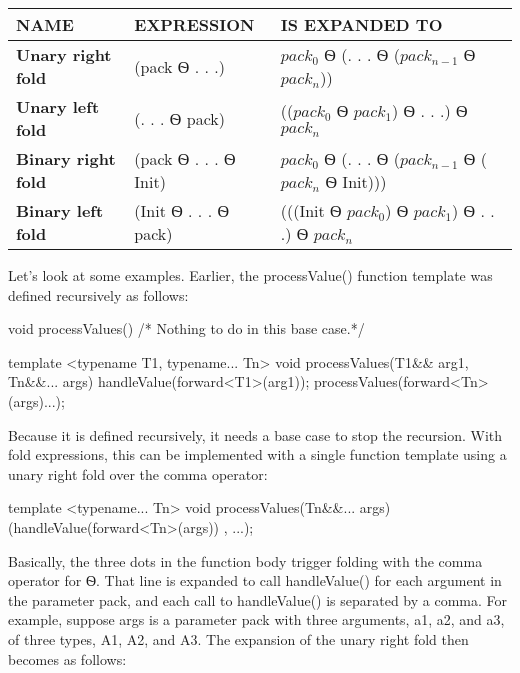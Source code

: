 \begin{longtable}{|l|l|l|}
\hline
\textbf{NAME}             & \textbf{EXPRESSION} & \textbf{IS EXPANDED TO}             \\ \hline
\endfirsthead
%
\endhead
%
\textbf{Unary right fold} & (pack Ѳ . . .)      & $pack_0$ Ѳ (. . . Ѳ ($pack_{n-1}$ Ѳ $pack_n$)) \\ \hline
\textbf{Unary left fold}  & (. . . Ѳ pack)      & (($pack_0$ Ѳ $pack_1$) Ѳ . . .) Ѳ $pack_n$   \\ \hline
\textbf{Binary right fold} & (pack Ѳ . . . Ѳ Init) & $pack_0$ Ѳ (. . . Ѳ ($pack_{n-1}$ Ѳ ($pack_n$ Ѳ Init))) \\ \hline
\textbf{Binary left fold}  & (Init Ѳ . . . Ѳ pack) & (((Init Ѳ $pack_0$) Ѳ $pack_1$) Ѳ . . .) Ѳ $pack_n$   \\ \hline
\end{longtable}

Let’s look at some examples. Earlier, the processValue() function template was defined recursively as follows:

\begin{cpp}
void processValues() { /* Nothing to do in this base case.*/ }

template <typename T1, typename... Tn>
void processValues(T1&& arg1, Tn&&... args)
{
    handleValue(forward<T1>(arg1));
    processValues(forward<Tn>(args)...);
}
\end{cpp}

Because it is defined recursively, it needs a base case to stop the recursion. With fold expressions, this can be implemented with a single function template using a unary right fold over the comma operator:

\begin{cpp}
template <typename... Tn>
void processValues(Tn&&... args) { (handleValue(forward<Tn>(args)) , ...); }
\end{cpp}

Basically, the three dots in the function body trigger folding with the comma operator for Ѳ. That line is expanded to call handleValue() for each argument in the parameter pack, and each call to handleValue() is separated by a comma. For example, suppose args is a parameter pack with three arguments, a1, a2, and a3, of three types, A1, A2, and A3. The expansion of the unary right fold then becomes as follows:

